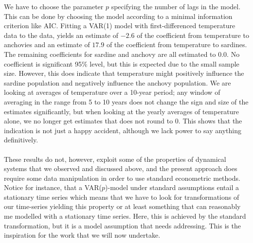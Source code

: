 \documentclass[11pt, a4paper]{memoir}
\theoremstyle{break}
\theoremstyle{break}
\theoremstyle{nonumberplain}
\begin{document}
We have to choose the parameter $p$ specifying the number of lags in the model. This can be done by choosing the model according to a minimal information criterion like AIC. Fitting a VAR(1) model with first-differenced temperature data to the data, yields an estimate of $-2.6$ of the coefficient from temperature to anchovies and an estimate of $17.9$ of the coefficient from temperature to sardines. The remaining coefficients for sardine and anchovy are all estimated to $0.0$. No coefficient is significant 95\% level, but this is expected due to the small sample size. However, this does indicate that temperature might positively influence the sardine population and negatively influence the anchovy population. We are looking at averages of temperature over a 10-year period; any window of averaging in the range from 5 to 10 years does not change the sign and size of the estimates significantly, but when looking at the yearly averages of temperature alone, we no longer get estimates that does not round to 0. This shows that the indication is not just a happy accident, although we lack power to say anything definitively.\\\\ 
These results do not, however, exploit some of the properties of dynamical systems that we observed and discussed above, and the present approach does require some data manipulation in order to use standard econometric methods. Notice for instance, that a VAR($p$)-model under standard assumptions entail a stationary time series which means that we have to look for transformations of our time-series yielding this property or at least something that can reasonably me modelled with a stationary time series. Here, this is achieved by the standard transformation, but it is a model assumption that needs addressing. This is the inspiration for the work that we will now undertake.
\end{document}
